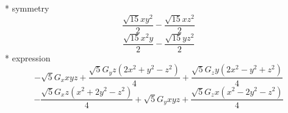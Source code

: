 \documentclass[fleqn,8pt]{jsarticle}
\begin{document}
\noindent\quad ** symmetry
\begin{dmath*}
\frac{\sqrt{15} x y^{2}}{2} - \frac{\sqrt{15} x z^{2}}{2}
\end{dmath*}
\begin{dmath*}
\frac{\sqrt{15} x^{2} y}{2} - \frac{\sqrt{15} y z^{2}}{2}
\end{dmath*}
\noindent\quad ** expression
\begin{dmath*}
- \sqrt{5} G_{x} x y z + \frac{\sqrt{5} G_{y} z \left(2 x^{2} + y^{2} - z^{2}\right)}{4} + \frac{\sqrt{5} G_{z} y \left(2 x^{2} - y^{2} + z^{2}\right)}{4}
\end{dmath*}
\begin{dmath*}
- \frac{\sqrt{5} G_{x} z \left(x^{2} + 2 y^{2} - z^{2}\right)}{4} + \sqrt{5} G_{y} x y z + \frac{\sqrt{5} G_{z} x \left(x^{2} - 2 y^{2} - z^{2}\right)}{4}
\end{dmath*}
\end{document}
